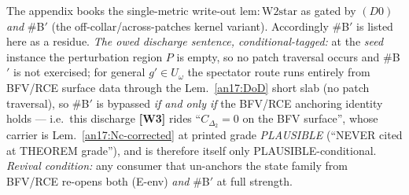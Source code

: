 \begin{remark}\label{pac:rem-Bprime}
The appendix books the single-metric write-out $\mathrm{lem:W2star}$ as gated by
$(D0)$ \emph{and} \#B$'$ (the off-collar/across-patches kernel
variant). Accordingly \#B$'$ is listed here as a residue. \emph{The owed discharge sentence,
conditional-tagged:} at the \emph{seed} instance the perturbation
region $P$ is empty, so no patch traversal occurs and \#B$'$ is not
exercised; for general $g'\in U_\omega$ the spectator route runs
entirely from BFV/RCE surface data through the Lem.~\ref{an17:DoD} short slab
(no patch traversal), so \#B$'$ is bypassed \emph{if and only if} the
BFV/RCE anchoring identity holds --- i.e.\ this discharge \textbf{[W3]} rides ``$C_{\Delta_2}=0$ on the BFV surface'', whose carrier is
Lem.~\ref{an17:Nc-corrected} at printed grade \emph{PLAUSIBLE}
(``NEVER cited at THEOREM grade''), and is therefore
itself only PLAUSIBLE-conditional. \emph{Revival condition:} any
consumer that un-anchors the state family from BFV/RCE re-opens both
(E-env) \emph{and} \#B$'$ at full strength.
\end{remark}


